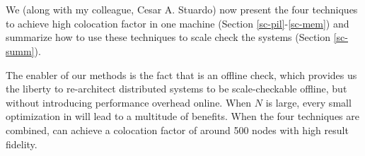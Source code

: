 \section{\sck}
\label{sec-sck-sck}

We (along with my colleague, Cesar A. Stuardo) now present the four \sck
techniques to achieve high colocation factor in one machine (Section
\ref{sc-pil}-\ref{sc-mem}) and summarize how to use these techniques to scale
check the systems (Section \ref{sc-summ}).

The enabler of our methods is the fact that \sck is an offline check, which
provides us the liberty to re-architect distributed systems to be
scale-checkable offline, but without introducing performance overhead online.
%
When $N$ is large, every small optimization in \sck will lead to a multitude of
benefits.
%
When the four techniques are combined, \sck can achieve a colocation factor of
around 500 nodes with high result fidelity.




